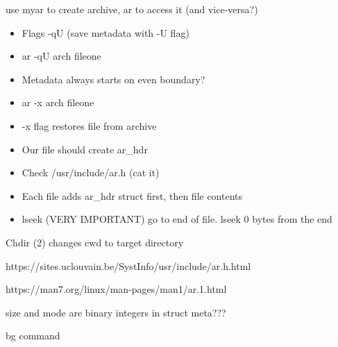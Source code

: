 use myar to create archive, ar to access it (and vice-versa?)
\begin{itemize}
    \item Flags -qU (save metadata with -U flag)
    \item ar -qU arch fileone
    \item Metadata always starts on even boundary?
    \item ar -x arch fileone
    \item -x flag restores file from archive
    \item Our file should create ar\_hdr
    \item Check /usr/include/ar.h (cat it)
    \item Each file adds ar\_hdr struct first, then file contents
    \item lseek (VERY IMPORTANT) go to end of file. lseek 0 bytes from the end
\end{itemize}
Chdir (2) changes cwd to target directory

https://sites.uclouvain.be/SystInfo/usr/include/ar.h.html

https://man7.org/linux/man-pages/man1/ar.1.html

size and mode are binary integers in struct meta???

bg command

